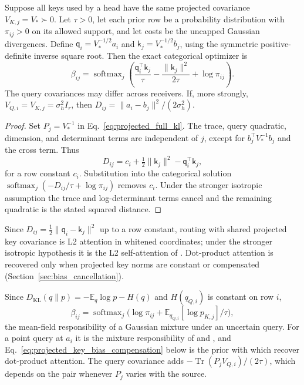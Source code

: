 \documentclass[twoside,11pt]{article}
\newcommand{\softmax}{\operatorname{softmax}}
\begin{document}
\begin{proposition}
\label{prop:projected_dot_product}
Suppose all keys used by a head have the same projected covariance $V_{K,j}=V_*\succ0$. Let $\tau>0$, let each prior row be a probability distribution with $\pi_{ij}>0$ on its allowed support, and let costs be the uncapped Gaussian divergences. Define $\mathsf q_i=V_*^{-1/2}a_i$ and $\mathsf k_j=V_*^{-1/2}b_j$, using the symmetric positive-definite inverse square root. Then the exact categorical optimizer is
\begin{equation}
\beta_{ij}=\softmax_j\left(
\frac{\mathsf q_i^\top\mathsf k_j}{\tau}
-\frac{\|\mathsf k_j\|^2}{2\tau}
+\log\pi_{ij}\right).
\label{eq:main_dot_product_scope}
\end{equation}
The query covariances may differ across receivers. If, more strongly, $V_{Q,i}=V_{K,j}=\sigma_h^2I_r$, then $D_{ij}=\|a_i-b_j\|^2/(2\sigma_h^2)$.
\end{proposition}
\begin{proof}
Set $P_j=V_*^{-1}$ in Eq.~\eqref{eq:projected_full_kl}. The trace, query quadratic, dimension, and determinant terms are independent of $j$, except for $b_j^\top V_*^{-1}b_j$ and the cross term. Thus
\begin{equation}
D_{ij}=c_i+\tfrac12\|\mathsf k_j\|^2
-\mathsf q_i^\top\mathsf k_j,
\label{eq:projected_kl_row_decomposition}
\end{equation}
for a row constant $c_i$. Substitution into the categorical solution $\softmax_j(-D_{ij}/\tau+\log\pi_{ij})$ removes $c_i$. Under the stronger isotropic assumption the trace and log-determinant terms cancel and the remaining quadratic is the stated squared distance.
\end{proof}
Since $D_{ij}=\tfrac12\|\mathsf q_i-\mathsf k_j\|^2$ up to a row constant, routing with shared projected key covariance is L2 attention in whitened coordinates; under the stronger isotropic hypothesis it is the L2 self-attention of \citet{Kim2021Lipschitz}. Dot-product attention is recovered only when projected key norms are constant or compensated (Section~\ref{sec:bias_cancellation}).

\begin{remark}
\label{rem:gaussian_mixture_attention}
Since $D_{\mathrm{KL}}(q\|p)=-\mathbb E_q\log p-H(q)$ and $H(q_{Q,i})$ is constant on row $i$,
\begin{equation}
\beta_{ij}=\softmax_j\bigl(\log\pi_{ij}+\mathbb E_{q_{Q,i}}[\log p_{K,j}]/\tau\bigr),
\end{equation}
the mean-field responsibility of a Gaussian mixture under an uncertain query. For a point query at $a_i$ it is the mixture responsibility of \citet{Movellan2020ProbabilisticTransformers} and \citet{Nguyen2022MGK}, and Eq.~\eqref{eq:projected_key_bias_compensation} below is the prior with which \citet[Eqs.~16 to 21]{Movellan2020ProbabilisticTransformers} recover dot-product attention. The query covariance adds $-\operatorname{Tr}(P_jV_{Q,i})/(2\tau)$, which depends on the pair whenever $P_j$ varies with the source.
\end{remark}
\end{document}
